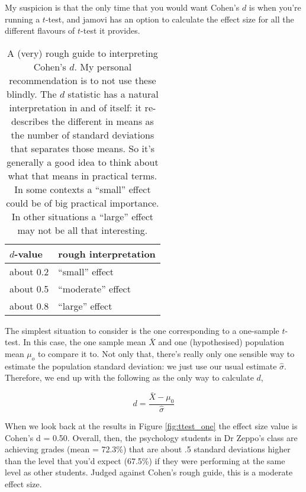 My suspicion is that the only time that you would want Cohen's $d$ is when you're running a $t$-test, and jamovi has an option to calculate the effect size for all the different flavours of $t$-test it provides. 

\begin{table}[t]
\caption{A (very) rough guide to interpreting Cohen's $d$. My personal recommendation is to not use these blindly. The $d$ statistic has a natural interpretation in and of itself: it re-describes the different in means as the number of standard deviations that separates those means. So it's generally a good idea to think about what that means in practical terms. In some contexts a ``small'' effect could be of big practical importance. In other situations a ``large'' effect may not be all that interesting.} 
\label{tab:cohensdinterpretation}
\centering
\vspace*{6pt}
\begin{tabular}{l|l}
$d$-value & rough interpretation \\ \hline
about 0.2 & ``small'' effect  \\
about 0.5 & ``moderate'' effect \\
about 0.8 & ``large'' effect 
\end{tabular}
\vspace*{6pt}
\HR
\end{table}


The simplest situation to consider is the one corresponding to a one-sample $t$-test. In this case, the one sample mean $\bar{X}$ and one (hypothesised) population mean $\mu_o$ to compare it to. Not only that, there's really only one sensible way to estimate the population standard deviation: we just use our usual estimate $\hat{\sigma}$. Therefore, we end up with the following as the only way to calculate $d$, 

$$
d = \frac{\bar{X} - \mu_0}{\hat{\sigma}}
$$

When we look back at the results in Figure \ref{fig:ttest_one} the effect size value is Cohen's d = 0.50. Overall, then, the psychology students in Dr Zeppo's class are achieving grades (mean = 72.3\%) that are about .5 standard deviations higher than the level that you'd expect (67.5\%) if they were performing at the same level as other students. Judged against Cohen's rough guide, this is a moderate effect size.



